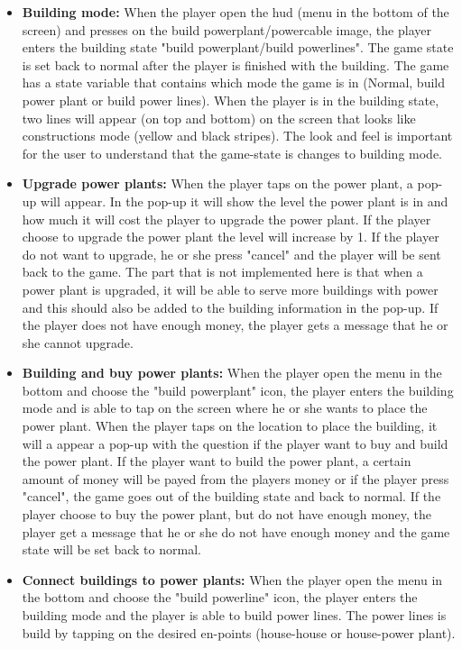 	\begin{itemize}
		\item {\bf Building mode:} When the player open the hud (menu in the bottom of the screen) and presses
		on the build powerplant/powercable image, the player enters the building state 
		"build powerplant/build powerlines". The game state is set back to normal after the player 
		is finished with the building. The game has a state variable that contains which mode the 
		game is in (Normal, build power plant or build power lines). When the player is in the building
		state, two lines will appear (on top and bottom) on the screen that looks like constructions mode
		(yellow and black stripes). The look and feel is important for the user to understand that
		the game-state is changes to building mode. 

		\item {\bf Upgrade power plants:} When the player taps on the power plant, a pop-up will appear.
		In the pop-up it will show the level the power plant is in and how much it will cost the 
		player to upgrade the power plant. If the player choose to upgrade the power plant the level will
		increase by 1. If the player do not want to upgrade, he or she press "cancel" and the player will be sent
		back to the game. The part that is not implemented here is that when a power plant is upgraded, 
		it will be able to serve more buildings with power and this should also be added to the building 
		information in the pop-up. If the player does not have enough money, the player gets a message 
		that he or she cannot upgrade.

		\item {\bf Building and buy power plants:} When the player open the menu in the bottom and 
		choose the "build powerplant" icon, the player enters the building mode and is able to 
		tap on the screen where he or she wants to place the power plant. When the player taps on the
		location to place the building, it will a appear a pop-up with the question if the player 
		want to buy and build the power plant. If the player want to build the power plant, a certain
		amount of money will be payed from the players money or if the player press "cancel", the 
		game goes out of the building state and back to normal. If the player choose to buy the 
		power plant, but do not have enough money, the player get a message that he or she do not have
		enough money and the game state will be set back to normal. 

		\item {\bf Connect buildings to power plants:} When the player open the menu in the bottom and 
		choose the "build powerline" icon, the player enters the building mode and the player is able
		to build power lines. The power lines is build by tapping on the desired en-points (house-house 
		or house-power plant).


\end{itemize}
